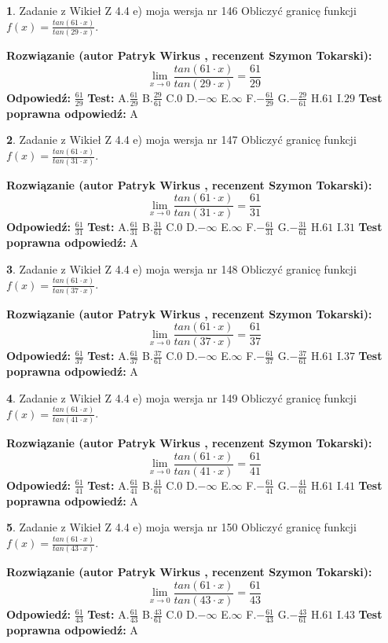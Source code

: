 \documentclass[12pt, a4paper]{article}
\theoremstyle{definition} %
\newtheorem{zad}{}
\newcommand{\zadStart}[1]{\begin{zad}#1\newline}
\newcommand{\zadStop}{\end{zad}}
\newcommand{\rozwStart}[2]{\noindent \textbf{Rozwiązanie (autor #1 , recenzent #2): }\newline}
\newcommand{\rozwStop}{\newline}
\newcommand{\odpStart}{\noindent \textbf{Odpowiedź:}\newline}
\newcommand{\odpStop}{\newline}
\newcommand{\testStart}{\noindent \textbf{Test:}\newline}
\newcommand{\testStop}{\newline}
\newcommand{\kluczStart}{\noindent \textbf{Test poprawna odpowiedź:}\newline}
\newcommand{\kluczStop}{\newline}
\begin{document}
\zadStart{Zadanie z Wikieł Z 4.4 e) moja wersja nr 146}
Obliczyć granicę funkcji $f(x)=\frac{tan(61\cdot x)}{tan(29\cdot x)}$.
\zadStop
\rozwStart{Patryk Wirkus}{Szymon Tokarski}
$$\lim\limits_{x\to 0}\frac{tan(61\cdot x)}{tan(29\cdot x)}=
\frac{61}{29}$$
\rozwStop
\odpStart
$\frac{61}{29}$
\odpStop
\testStart
A.$\frac{61}{29}$
B.$\frac{29}{61}$
C.$0$
D.$-\infty$
E.$\infty$
F.$-\frac{61}{29}$
G.$-\frac{29}{61}$
H.$61$
I.$29$
\testStop
\kluczStart
A
\kluczStop



\zadStart{Zadanie z Wikieł Z 4.4 e) moja wersja nr 147}
Obliczyć granicę funkcji $f(x)=\frac{tan(61\cdot x)}{tan(31\cdot x)}$.
\zadStop
\rozwStart{Patryk Wirkus}{Szymon Tokarski}
$$\lim\limits_{x\to 0}\frac{tan(61\cdot x)}{tan(31\cdot x)}=
\frac{61}{31}$$
\rozwStop
\odpStart
$\frac{61}{31}$
\odpStop
\testStart
A.$\frac{61}{31}$
B.$\frac{31}{61}$
C.$0$
D.$-\infty$
E.$\infty$
F.$-\frac{61}{31}$
G.$-\frac{31}{61}$
H.$61$
I.$31$
\testStop
\kluczStart
A
\kluczStop



\zadStart{Zadanie z Wikieł Z 4.4 e) moja wersja nr 148}
Obliczyć granicę funkcji $f(x)=\frac{tan(61\cdot x)}{tan(37\cdot x)}$.
\zadStop
\rozwStart{Patryk Wirkus}{Szymon Tokarski}
$$\lim\limits_{x\to 0}\frac{tan(61\cdot x)}{tan(37\cdot x)}=
\frac{61}{37}$$
\rozwStop
\odpStart
$\frac{61}{37}$
\odpStop
\testStart
A.$\frac{61}{37}$
B.$\frac{37}{61}$
C.$0$
D.$-\infty$
E.$\infty$
F.$-\frac{61}{37}$
G.$-\frac{37}{61}$
H.$61$
I.$37$
\testStop
\kluczStart
A
\kluczStop



\zadStart{Zadanie z Wikieł Z 4.4 e) moja wersja nr 149}
Obliczyć granicę funkcji $f(x)=\frac{tan(61\cdot x)}{tan(41\cdot x)}$.
\zadStop
\rozwStart{Patryk Wirkus}{Szymon Tokarski}
$$\lim\limits_{x\to 0}\frac{tan(61\cdot x)}{tan(41\cdot x)}=
\frac{61}{41}$$
\rozwStop
\odpStart
$\frac{61}{41}$
\odpStop
\testStart
A.$\frac{61}{41}$
B.$\frac{41}{61}$
C.$0$
D.$-\infty$
E.$\infty$
F.$-\frac{61}{41}$
G.$-\frac{41}{61}$
H.$61$
I.$41$
\testStop
\kluczStart
A
\kluczStop



\zadStart{Zadanie z Wikieł Z 4.4 e) moja wersja nr 150}
Obliczyć granicę funkcji $f(x)=\frac{tan(61\cdot x)}{tan(43\cdot x)}$.
\zadStop
\rozwStart{Patryk Wirkus}{Szymon Tokarski}
$$\lim\limits_{x\to 0}\frac{tan(61\cdot x)}{tan(43\cdot x)}=
\frac{61}{43}$$
\rozwStop
\odpStart
$\frac{61}{43}$
\odpStop
\testStart
A.$\frac{61}{43}$
B.$\frac{43}{61}$
C.$0$
D.$-\infty$
E.$\infty$
F.$-\frac{61}{43}$
G.$-\frac{43}{61}$
H.$61$
I.$43$
\testStop
\kluczStart
A
\kluczStop
\end{document}
